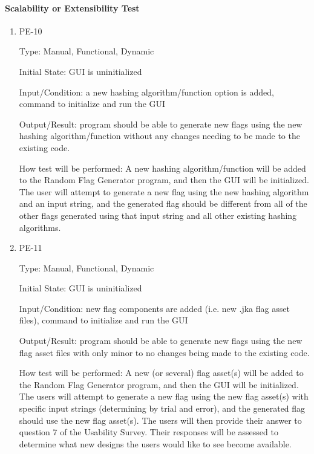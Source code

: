 \documentclass[12pt, titlepage]{article}
\begin{document}
\paragraph{Scalability or Extensibility Test}

\begin{enumerate}

\item{PE-10\\}

Type: Manual, Functional, Dynamic

Initial State: GUI is uninitialized

Input/Condition: a new hashing algorithm/function option is added, command to
initialize and run the GUI

Output/Result: program should be able to generate new flags using the new
hashing algorithm/function without any changes needing to be made to the
existing code.

How test will be performed: A new hashing algorithm/function will be added to
the Random Flag Generator program, and then the GUI will be initialized. The
user will attempt to generate a new flag using the new hashing algorithm and
an input string, and the generated flag should be different from all of the
other flags generated using that input string and all other existing hashing
algorithms.

\item{PE-11\\}

Type: Manual, Functional, Dynamic

Initial State: GUI is uninitialized

Input/Condition: new flag components are added (i.e. new .jka flag asset
files), command to initialize and run the GUI

Output/Result: program should be able to generate new flags using the new flag
asset files with only minor to no changes being made to the existing code.

How test will be performed: A new (or several) flag asset(s) will be added to
the Random Flag Generator program, and then the GUI will be initialized. The
users will attempt to generate a new flag using the new flag asset(s) with
specific input strings (determining by trial and error), and the generated
flag should use the new flag asset(s). The users will then provide their
answer to question 7 of the Usability Survey. Their responses will be assessed
to determine what new designs the users would like to see become available.

\end{enumerate}
\end{document}
